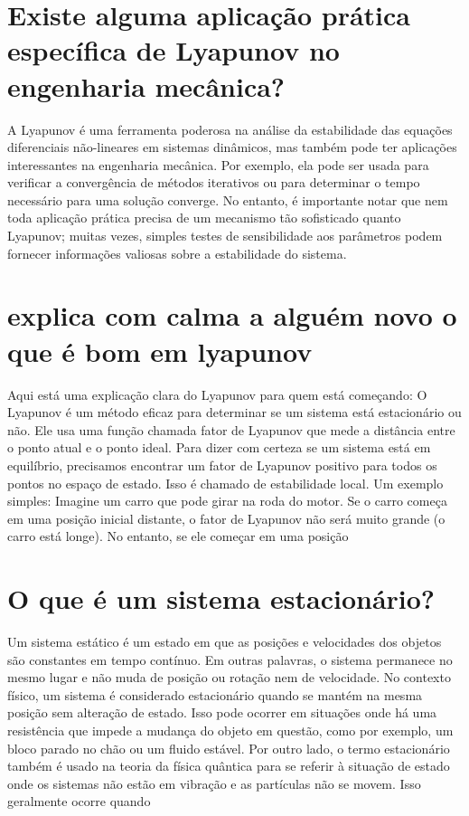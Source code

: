 \documentclass[11pt,a4paper]{article}
\begin{document}
\section{Existe alguma aplicação prática específica de Lyapunov no engenharia mecânica?}
A Lyapunov é uma ferramenta poderosa na análise da estabilidade das equações diferenciais não-lineares em sistemas dinâmicos, mas também pode ter aplicações interessantes na engenharia mecânica. Por exemplo, ela pode ser usada para verificar a convergência de métodos iterativos ou para determinar o tempo necessário para uma solução converge. No entanto, é importante notar que nem toda aplicação prática precisa de um mecanismo tão sofisticado quanto Lyapunov; muitas vezes, simples testes de sensibilidade aos parâmetros podem fornecer informações valiosas sobre a estabilidade do sistema.

\section{explica com calma a alguém novo o que é bom em lyapunov}
Aqui está uma explicação clara do Lyapunov para quem está começando: O Lyapunov é um método eficaz para determinar se um sistema está estacionário ou não. Ele usa uma função chamada fator de Lyapunov que mede a distância entre o ponto atual e o ponto ideal. Para dizer com certeza se um sistema está em equilíbrio, precisamos encontrar um fator de Lyapunov positivo para todos os pontos no espaço de estado. Isso é chamado de estabilidade local. Um exemplo simples: Imagine um carro que pode girar na roda do motor. Se o carro começa em uma posição inicial distante, o fator de Lyapunov não será muito grande (o carro está longe). No entanto, se ele começar em uma posição

\section{O que é um sistema estacionário?}
Um sistema estático é um estado em que as posições e velocidades dos objetos são constantes em tempo contínuo. Em outras palavras, o sistema permanece no mesmo lugar e não muda de posição ou rotação nem de velocidade. No contexto físico, um sistema é considerado estacionário quando se mantém na mesma posição sem alteração de estado. Isso pode ocorrer em situações onde há uma resistência que impede a mudança do objeto em questão, como por exemplo, um bloco parado no chão ou um fluido estável. Por outro lado, o termo estacionário também é usado na teoria da física quântica para se referir à situação de estado onde os sistemas não estão em vibração e as partículas não se movem. Isso geralmente ocorre quando
\end{document}
